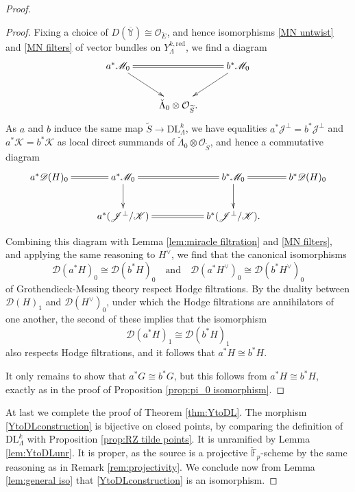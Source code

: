\documentclass[11pt]{alggeom}
\newcommand{\iso}{\cong}
\newcommand{\red}{\mathrm{red}}
\newcommand{\F}{\mathbb F}
\newcommand{\co}{\mathcal O}
\begin{document}
\begin{proof}
\begin{proof}
Fixing a choice of $D(\overline{\mathbb{Y}}) \iso \co_{\breve{E}}$, and hence isomorphisms \eqref{MN untwist} and \eqref{MN filters} of vector bundles on $Y^{k,\red}_\Lambda$, we find a diagram 
\[
\xymatrix{
{  a^*\mathscr{M}_0 }  \ar[dr]   \ar@{=}[rr]& &{ b^*\mathscr{M}_0  }  \ar[dl]  \\
&  { \breve{\Lambda}_0 \otimes \co_{\widetilde{S}} .}
}
\]
As $a$ and $b$ induce the same map $\widetilde{S} \to \mathrm{DL}_\Lambda^k$, we have equalities 
$a^*\mathscr{J}^\perp=b^*\mathscr{J}^\perp$ and $a^*\mathscr{K}=b^*\mathscr{K}$ as local direct summands of  $\breve{\Lambda}_0 \otimes \co_{\widetilde{S}}$, and hence a commutative diagram
\[
\xymatrix{
{ a^* \mathscr{D}(H)_0 } \ar@{=}[r] &{  a^*\mathscr{M}_0 }  \ar[d]   \ar@{=}[rr]& &{ b^*\mathscr{M}_0  }  \ar[d]  \ar@{=}[r] 
&  {  b^* \mathscr{D}(H)_0  }  \\
& {  a^*(\mathscr{J}^\perp / \mathscr{K} ) }    \ar@{=}[rr]& &{ b^*  ( \mathscr{J}^\perp / \mathscr{K} ) . }  
}
\]


Combining this diagram with Lemma \ref{lem:miracle filtration} and \eqref{MN filters}, and applying the same reasoning to $H^\vee$, we find that the canonical isomorphisms 
\[
\mathscr{D}(a^*H)_0 \iso \mathscr{D}(b^*H)_0  \quad\mbox{and}\quad \mathscr{D}(a^*H^\vee)_0 \iso \mathscr{D}(b^*H^\vee)_0 
\]
of Grothendieck-Messing theory respect Hodge filtrations.  By the duality between $\mathscr{D}(H)_1$ and $\mathscr{D}(H^\vee)_0$, under which the Hodge filtrations are annihilators of one another, the second of these implies that the isomorphism
\[
\mathscr{D}(a^*H)_1 \iso \mathscr{D}(b^*H)_1 
\]
also respects Hodge filtrations, and it follows that $a^*H \iso b^*H$.

It only remains to show that $a^*G \iso b^*G$, but this follows from $a^*H \iso b^*H$, exactly as in  the proof of Proposition \ref{prop:pi_0 isomorphism}.
\end{proof}


At last we complete the proof of Theorem \ref{thm:YtoDL}.
The morphism \eqref{YtoDLconstruction} is bijective on closed points, by comparing the definition of $\mathrm{DL}_\Lambda^k$ with Proposition \ref{prop:RZ tilde points}.
It is unramified by Lemma \ref{lem:YtoDLunr}.  
It is proper, as  the source is a projective  $\breve{\F}_p$-scheme by the same reasoning as in Remark \ref{rem:projectivity}.
We conclude now from  Lemma \ref{lem:general iso} that \eqref{YtoDLconstruction} is an isomorphism.
\end{proof}
\end{document}
